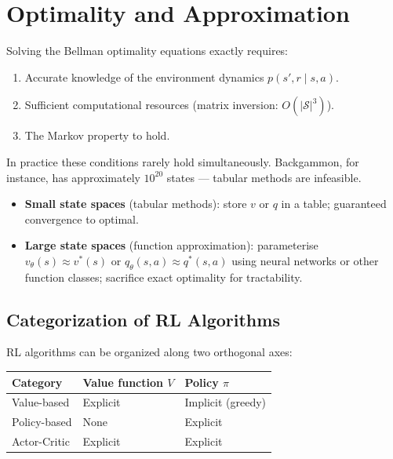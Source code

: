 \documentclass[11pt,a4paper]{article}
\theoremstyle{definition}
\theoremstyle{plain}
\theoremstyle{remark}
\begin{document}
\section{Optimality and Approximation}

Solving the Bellman optimality equations exactly requires:
\begin{enumerate}
    \item Accurate knowledge of the environment dynamics $p(s', r \mid s, a)$.
    \item Sufficient computational resources (matrix inversion: $O(|\mathcal{S}|^3)$).
    \item The Markov property to hold.
\end{enumerate}
In practice these conditions rarely hold simultaneously. Backgammon, for instance, has approximately $10^{20}$ states — tabular methods are infeasible.

\begin{tcolorbox}[colback=yellow!10!white, colframe=orange!80!black, title={Tabular vs.\ Approximate Methods}]
\begin{itemize}
    \item \textbf{Small state spaces} (tabular methods): store $v$ or $q$ in a table; guaranteed convergence to optimal.
    \item \textbf{Large state spaces} (function approximation): parameterise $v_\theta(s) \approx v^*(s)$ or $q_\theta(s,a) \approx q^*(s,a)$ using neural networks or other function classes; sacrifice exact optimality for tractability.
\end{itemize}
\end{tcolorbox}

\subsection{Categorization of RL Algorithms}

RL algorithms can be organized along two orthogonal axes:

\begin{center}
\begin{tabular}{lll}
\hline
\textbf{Category} & \textbf{Value function $V$} & \textbf{Policy $\pi$} \\
\hline
Value-based   & Explicit & Implicit (greedy) \\
Policy-based  & None     & Explicit           \\
Actor-Critic  & Explicit & Explicit           \\
\hline
\end{tabular}
\end{center}
\end{document}
